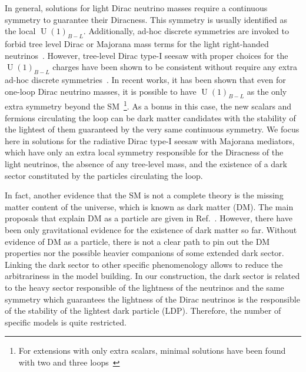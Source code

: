\documentclass[12pt]{article}
\begin{document}
In general, solutions for light Dirac neutrino masses require a
continuous symmetry to guarantee their Diracness. This symmetry is
usually identified as the local $\operatorname{U}(1)_{B-L}$.
Additionally, ad-hoc discrete symmetries are invoked to forbid tree
level Dirac or Majorana mass terms for the light right-handed
neutrinos~\cite{Roncadelli:1983ty,Han:2018zcn,Wang:2017mcy}.
However, tree-level Dirac type-I seesaw with proper choices for the
$\operatorname{U}(1)_{B-L}$ charges have been shown to be consistent
without require any extra ad-hoc discrete symmetries~\cite{Ma:2014qra}.
In recent works, it has been shown that even for one-loop Dirac
neutrino masses, it is possible to have $\operatorname{U}(1)_{B-L}$ as
the only extra symmetry beyond the SM~\cite{Calle:2018ovc,Bonilla:2018ynb,Saad:2019bqf}\footnote{
  For extensions with only extra scalars, minimal solutions have been found with two and three loops~\cite{Saad:2019bqf}}.
As a bonus in this case, the new scalars and fermions circulating the
loop can be dark matter candidates with the stability of the lightest
of them guaranteed by the very same continuous symmetry.
We focus here in solutions for the radiative Dirac type-I seesaw with
Majorana mediators, which have only an extra local symmetry responsible for the
Diracness of the light neutrinos, the absence of any tree-level
mass, and the existence of a dark sector constituted by the
particles circulating the loop.

In fact, another evidence that the SM is not a complete theory is the
missing matter content of the universe, which is known as dark matter
(DM).
The main proposals that explain DM as a particle are given in
Ref.~\cite{Bertone:2004pz}.
However, there have been only gravitational evidence for the existence
of dark matter so far.
Without evidence of DM as a particle, there is not a clear path to pin
out the DM properties nor the possible heavier companions of some
extended dark sector. 
Linking the dark sector to other specific phenomenology allows to
reduce the arbitrariness in the model building.
In our construction, the dark sector is related to the heavy sector
responsible of the lightness of the neutrinos and the same symmetry
which guarantees the lightness of the Dirac neutrinos is the
responsible of the stability of the lightest dark particle (LDP).
Therefore, the number of specific models is quite restricted.
\end{document}
